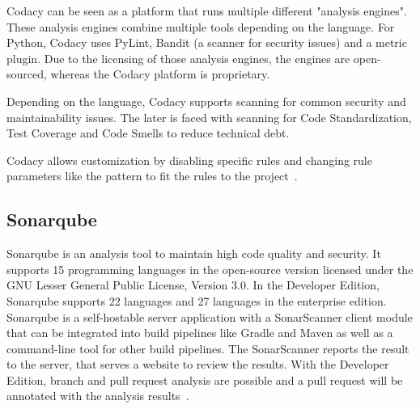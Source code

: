 Codacy can be seen as a platform that runs multiple different "analysis engines". These analysis engines combine multiple tools depending on the language. For Python, Codacy uses  PyLint, Bandit (a scanner for security issues) and a metric plugin.
Due to the licensing of those analysis engines, the engines are open-sourced, whereas the Codacy platform is proprietary.

Depending on the language, Codacy supports scanning for common security and maintainability issues. The later is faced with scanning for Code Standardization, Test Coverage and Code Smells to reduce technical debt.

Codacy allows customization by disabling specific rules and changing rule parameters like the pattern to fit the rules to the project~\cite{noauthor_codacy_nodate}. 

\subsection{Sonarqube}
Sonarqube is an analysis tool to maintain high code quality and security. It supports 15 programming languages in the open-source version licensed under the GNU Lesser General Public License, Version 3.0. In the Developer Edition, Sonarqube supports 22 languages and 27 languages in the enterprise edition. Sonarqube is a self-hostable server application with a SonarScanner client module that can be integrated into build pipelines like Gradle and Maven as well as a command-line tool for other build pipelines. The SonarScanner reports the result to the server, that serves a website to review the results. With the Developer Edition, branch and pull request analysis are possible and a pull request will be annotated with the analysis results~\cite{noauthor_code_nodate}.

